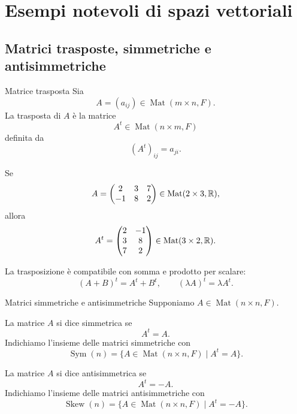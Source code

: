\documentclass[a4paper]{article}
\begin{document}
\section{Esempi notevoli di spazi vettoriali}

\subsection{Matrici trasposte, simmetriche e antisimmetriche}

\begin{snippetdefinition}{Matrice trasposta}
    Sia
    \[
        A=(a_{ij})\in\operatorname{Mat}(m\times n,F).
    \]
    La trasposta di \(A\) è la matrice
    \[
        A^t\in\operatorname{Mat}(n\times m,F)
    \]
    definita da
    \[
        (A^t)_{ij}=a_{ji}.
    \]
\end{snippetdefinition}

\begin{snippetexample}{}
    Se
    \[
        A=
        \begin{pmatrix}
            2 & 3 & 7\\
            -1 & 8 & 2
        \end{pmatrix}
        \in\operatorname{Mat}(2\times 3,\mathbb{R}),
    \]
    allora
    \[
        A^t=
        \begin{pmatrix}
            2 & -1\\
            3 & 8\\
            7 & 2
        \end{pmatrix}
        \in\operatorname{Mat}(3\times 2,\mathbb{R}).
    \]
\end{snippetexample}

La trasposizione è compatibile con somma e prodotto per scalare:
\[
    (A+B)^t=A^t+B^t,
    \qquad
    (\lambda A)^t=\lambda A^t.
\]

\begin{snippetdefinition}{Matrici simmetriche e antisimmetriche}
    Supponiamo \(A\in\operatorname{Mat}(n\times n,F)\).

    La matrice \(A\) si dice simmetrica se
    \[
        A^t=A.
    \]
    Indichiamo l'insieme delle matrici simmetriche con
    \[
        \operatorname{Sym}(n)=\{A\in\operatorname{Mat}(n\times n,F)\mid A^t=A\}.
    \]

    La matrice \(A\) si dice antisimmetrica se
    \[
        A^t=-A.
    \]
    Indichiamo l'insieme delle matrici antisimmetriche con
    \[
        \operatorname{Skew}(n)=\{A\in\operatorname{Mat}(n\times n,F)\mid A^t=-A\}.
    \]
\end{snippetdefinition}
\end{document}
